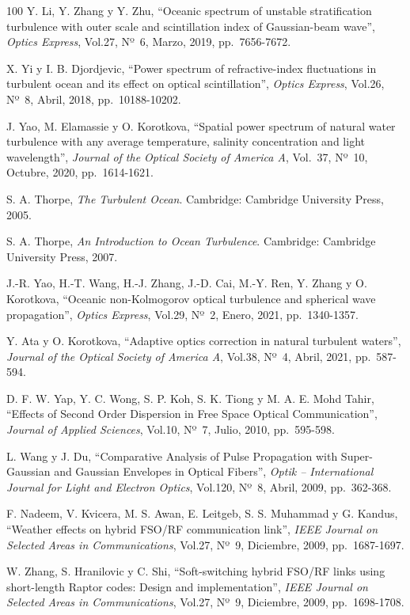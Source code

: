 \begin{thebibliography}{100}
Y. Li, Y. Zhang y Y. Zhu,
``Oceanic spectrum of unstable stratification turbulence with outer scale and scintillation index of Gaussian-beam wave'',
\textit{Optics Express},
Vol.27, Nº~6, Marzo, 2019, pp.~7656-7672.

X. Yi y I. B. Djordjevic,
``Power spectrum of refractive-index fluctuations in turbulent ocean and its effect on optical scintillation'',
\textit{Optics Express},
Vol.26, Nº~8, Abril, 2018, pp.~10188-10202.

J. Yao, M. Elamassie y O. Korotkova,
``Spatial power spectrum of natural water turbulence with any average temperature, salinity concentration and light wavelength'',
\textit{Journal of the Optical Society of America A},
Vol.~37, Nº~10, Octubre, 2020, pp.~1614-1621.

S. A. Thorpe,
\textit{The Turbulent Ocean}.
Cambridge: Cambridge University Press, 2005.

S. A. Thorpe,
\textit{An Introduction to Ocean Turbulence}.
Cambridge: Cambridge University Press, 2007.

J.-R. Yao, H.-T. Wang, H.-J. Zhang, J.-D. Cai, M.-Y. Ren, Y. Zhang y O. Korotkova,
``Oceanic non-Kolmogorov optical turbulence and spherical wave propagation'',
\textit{Optics Express},
Vol.29, Nº~2, Enero, 2021, pp.~1340-1357.

Y. Ata y O. Korotkova,
``Adaptive optics correction in natural turbulent waters'',
\textit{Journal of the Optical Society of America A},
Vol.38, Nº~4, Abril, 2021, pp.~587-594.

D. F. W. Yap, Y. C. Wong, S. P. Koh, S. K. Tiong y M. A. E. Mohd Tahir,
``Effects of Second Order Dispersion in Free Space Optical Communication'',
\textit{Journal of Applied Sciences},
Vol.10, Nº~7, Julio, 2010, pp.~595-598.

L. Wang y J. Du,
``Comparative Analysis of Pulse Propagation with Super-Gaussian and Gaussian Envelopes in Optical Fibers'',
\textit{Optik -- International Journal for Light and Electron Optics},
Vol.120, Nº~8, Abril, 2009, pp.~362-368.

F. Nadeem, V. Kvicera, M. S. Awan, E. Leitgeb, S. S. Muhammad y G. Kandus,
``Weather effects on hybrid FSO/RF communication link'',
\textit{IEEE Journal on Selected Areas in Communications},
Vol.27, Nº~9, Diciembre, 2009, pp.~1687-1697.

W. Zhang, S. Hranilovic y C. Shi,
``Soft-switching hybrid FSO/RF links using short-length Raptor codes: Design and implementation'',
\textit{IEEE Journal on Selected Areas in Communications},
Vol.27, Nº~9, Diciembre, 2009, pp.~1698-1708.


\end{thebibliography}
